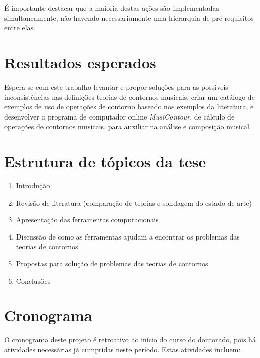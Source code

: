 \documentclass[12pt]{article}
\newcommand{\eng}[1]{\textit{#1}}
\begin{document}
É importante destacar que a maioria destas ações são implementadas
simultaneamente, não havendo necessariamente uma hierarquia de
pré-requisitos entre elas.

\section{Resultados esperados}
\label{sec:resultados-esperados}

Espera-se com este trabalho levantar e propor soluções para as
possíveis inconsistências nas definições teorias de contornos
musicais, criar um catálogo de exemplos de uso de operações de
contorno baseado nos exemplos da literatura, e desenvolver o programa
de computador online \eng{MusiContour}, de cálculo de operações de
contornos musicais, para auxiliar na análise e composição musical.

\section{Estrutura de tópicos da tese}
\label{sec:estrutura-de-topicos}

\begin{enumerate}
\item Introdução
\item Revisão de literatura (comparação de teorias e sondagem do
  estado de arte)
\item Apresentação das ferramentas computacionais
\item Discussão de como as ferramentas ajudam a encontrar os problemas
  das teorias de contornos
\item Propostas para solução de problemas das teorias de contornos
\item Conclusões
\end{enumerate}

\section{Cronograma}
\label{sec:cronograma}

O cronograma deste projeto é retroativo ao início do curso do
doutorado, pois há atividades necessárias já cumpridas neste
período. Estas atividades incluem:
\end{document}
